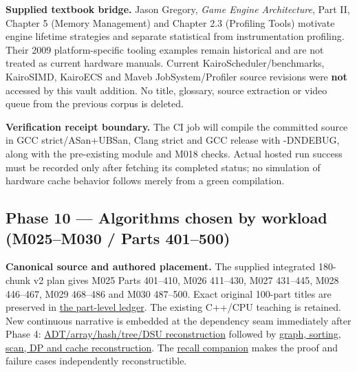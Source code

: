 \textbf{Supplied textbook bridge.} Jason Gregory, \emph{Game Engine Architecture}, Part II, Chapter 5 (Memory Management) and Chapter 2.3 (Profiling Tools) motivate engine lifetime strategies and separate statistical from instrumentation profiling. Their 2009 platform-specific tooling examples remain historical and are not treated as current hardware manuals. Current KairoScheduler/benchmarks, KairoSIMD, KairoECS and Maveb JobSystem/Profiler source revisions were \textbf{not} accessed by this vault addition. No title, glossary, source extraction or video queue from the previous corpus is deleted.

\textbf{Verification receipt boundary.} The CI job will compile the committed source in GCC strict/ASan+UBSan, Clang strict and GCC release with -DNDEBUG, along with the pre-existing module and M018 checks. Actual hosted run success must be recorded only after fetching its completed status; no simulation of hardware cache behavior follows merely from a green compilation.

\subsection{Phase 10 --- Algorithms chosen by workload (M025--M030 / Parts 401--500)}\label{appendix-a103e7846d21-phase-10-algorithms-chosen-by-workload-m025m030-parts-401500}

\textbf{Canonical source and authored placement.} The supplied integrated 180-chunk v2 plan gives M025 Parts 401--410, M026 411--430, M027 431--445, M028 446--467, M029 468--486 and M030 487--500. Exact original 100-part titles are preserved in \hyperref[appendix-fd090d982a15-phase-5-algorithms-and-data-structure-workload-contracts-parts-401500]{the part-level ledger}. The existing C++/CPU teaching is retained. New continuous narrative is embedded at the dependency seam immediately after Phase 4: \hyperref[01-foundations-i-ch007-the-scene-is-now-too-large-for-the-wrong-container-phase-5-m025m027-parts-401445]{ADT/array/hash/tree/DSU reconstruction} followed by \hyperref[01-foundations-i-ch008-from-an-asset-map-to-a-correct-navigable-world-phase-5-m028m030-parts-446500]{graph, sorting, scan, DP and cache reconstruction}. The \hyperref[appendix-8a046b38375e]{recall companion} makes the proof and failure cases independently reconstructible.

